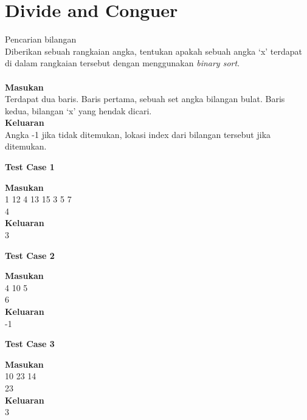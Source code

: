 \chapter{Divide and Conguer}

\begin{permasalahan}{Pencarian bilangan}\\
Diberikan sebuah rangkaian angka, tentukan apakah sebuah angka `x' terdapat di dalam rangkaian tersebut dengan menggunakan \textit{binary sort}.\\
	\\
	\textbf{Masukan}\\
	Terdapat dua baris. Baris pertama, sebuah set angka bilangan bulat. Baris kedua, bilangan `x' yang hendak dicari.\\
	\textbf{Keluaran}\\
	Angka -1 jika tidak ditemukan, lokasi index dari bilangan tersebut jika ditemukan.\\
	\begin{center}
	\textbf{Test Case 1}\\
	\end{center}
	\textbf{Masukan}\\
	1 12 4 13 15 3 5 7\\
	4\\
	\textbf{Keluaran}\\
	3\\
	\begin{center}
	\textbf{Test Case 2}\\
	\end{center}
	\textbf{Masukan}\\
	4 10 5\\
	6\\

	\textbf{Keluaran}\\
  -1\\
	\begin{center}
	\textbf{Test Case 3}\\
	\end{center}
	\textbf{Masukan}\\
	10 23 14\\
	23\\
	\textbf{Keluaran}\\
  3\\
\end{permasalahan}

\newpage

